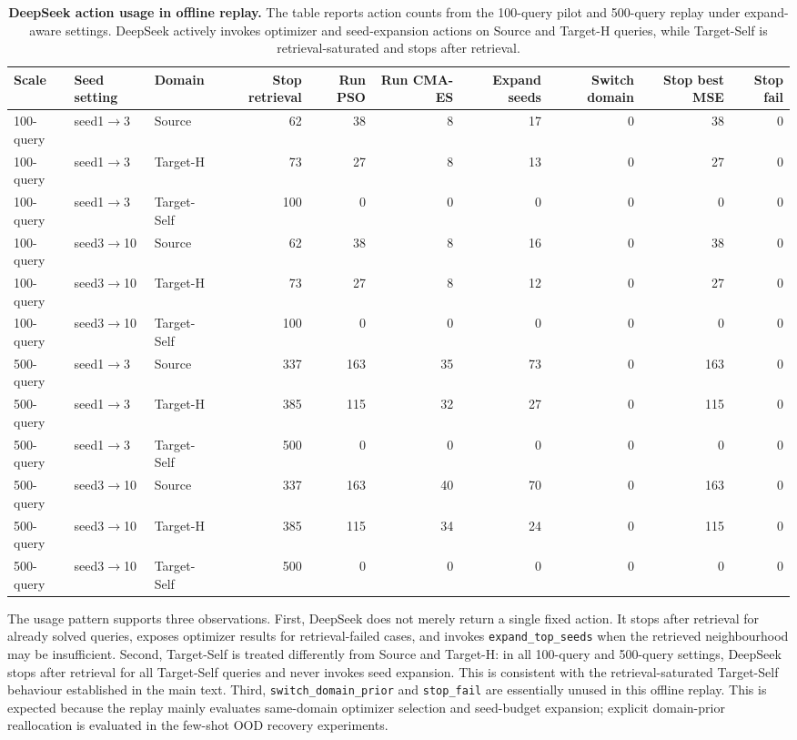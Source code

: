 \documentclass[final,1p,times]{elsarticle}
\newcommand{\code}[1]{\texttt{#1}}
\begin{document}
\begin{table}[htbp!]
\centering
\caption{\textbf{DeepSeek action usage in offline replay.}
The table reports action counts from the 100-query pilot and 500-query replay under expand-aware settings. DeepSeek actively invokes optimizer and seed-expansion actions on Source and Target-H queries, while Target-Self is retrieval-saturated and stops after retrieval.}
\label{tab:si_deepseek_action_usage}
\footnotesize
\setlength{\tabcolsep}{3.6pt}
\renewcommand{\arraystretch}{1.12}
\begin{tabular}{lllrrrrrrr}
\toprule
Scale & Seed setting & Domain &
Stop retrieval & Run PSO & Run CMA-ES & Expand seeds & Switch domain & Stop best MSE & Stop fail \\
\midrule
100-query & seed1$\rightarrow$3 & Source & 62 & 38 & 8 & 17 & 0 & 38 & 0 \\
100-query & seed1$\rightarrow$3 & Target-H & 73 & 27 & 8 & 13 & 0 & 27 & 0 \\
100-query & seed1$\rightarrow$3 & Target-Self & 100 & 0 & 0 & 0 & 0 & 0 & 0 \\
100-query & seed3$\rightarrow$10 & Source & 62 & 38 & 8 & 16 & 0 & 38 & 0 \\
100-query & seed3$\rightarrow$10 & Target-H & 73 & 27 & 8 & 12 & 0 & 27 & 0 \\
100-query & seed3$\rightarrow$10 & Target-Self & 100 & 0 & 0 & 0 & 0 & 0 & 0 \\
\midrule
500-query & seed1$\rightarrow$3 & Source & 337 & 163 & 35 & 73 & 0 & 163 & 0 \\
500-query & seed1$\rightarrow$3 & Target-H & 385 & 115 & 32 & 27 & 0 & 115 & 0 \\
500-query & seed1$\rightarrow$3 & Target-Self & 500 & 0 & 0 & 0 & 0 & 0 & 0 \\
500-query & seed3$\rightarrow$10 & Source & 337 & 163 & 40 & 70 & 0 & 163 & 0 \\
500-query & seed3$\rightarrow$10 & Target-H & 385 & 115 & 34 & 24 & 0 & 115 & 0 \\
500-query & seed3$\rightarrow$10 & Target-Self & 500 & 0 & 0 & 0 & 0 & 0 & 0 \\
\bottomrule
\end{tabular}
\end{table}

The usage pattern supports three observations. First, DeepSeek does not merely return a single fixed action. It stops after retrieval for already solved queries, exposes optimizer results for retrieval-failed cases, and invokes \code{expand\_top\_seeds} when the retrieved neighbourhood may be insufficient. Second, Target-Self is treated differently from Source and Target-H: in all 100-query and 500-query settings, DeepSeek stops after retrieval for all Target-Self queries and never invokes seed expansion. This is consistent with the retrieval-saturated Target-Self behaviour established in the main text. Third, \code{switch\_domain\_prior} and \code{stop\_fail} are essentially unused in this offline replay. This is expected because the replay mainly evaluates same-domain optimizer selection and seed-budget expansion; explicit domain-prior reallocation is evaluated in the few-shot OOD recovery experiments.
\end{document}

